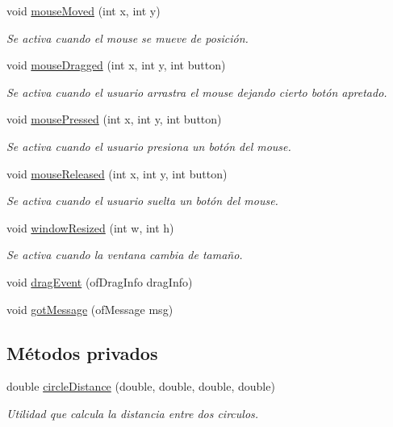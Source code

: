 \begin{DoxyCompactItemize}
void \hyperlink{classof_app_a158b41a606310db4633fdb817b21047c}{mouse\+Moved} (int x, int y)
\begin{DoxyCompactList}\small\item\em Se activa cuando el mouse se mueve de posición. \end{DoxyCompactList}\item 
void \hyperlink{classof_app_a1ec53d1be799dc275806ff6c6548cd83}{mouse\+Dragged} (int x, int y, int button)
\begin{DoxyCompactList}\small\item\em Se activa cuando el usuario arrastra el mouse dejando cierto botón apretado. \end{DoxyCompactList}\item 
void \hyperlink{classof_app_a2c2ea9c160231e55424dfd98466ef27d}{mouse\+Pressed} (int x, int y, int button)
\begin{DoxyCompactList}\small\item\em Se activa cuando el usuario presiona un botón del mouse. \end{DoxyCompactList}\item 
void \hyperlink{classof_app_aa3131f1554fc49eaa9ee0f284e48129b}{mouse\+Released} (int x, int y, int button)
\begin{DoxyCompactList}\small\item\em Se activa cuando el usuario suelta un botón del mouse. \end{DoxyCompactList}\item 
void \hyperlink{classof_app_ae4dc1ec1513dcbe48bc78a5e4c3fac0f}{window\+Resized} (int w, int h)
\begin{DoxyCompactList}\small\item\em Se activa cuando la ventana cambia de tamaño. \end{DoxyCompactList}\item 
void \hyperlink{classof_app_aada5a79556321801567752a0e5a69bda}{drag\+Event} (of\+Drag\+Info drag\+Info)
\item 
void \hyperlink{classof_app_a885672a72340a5e998af1d16718dc766}{got\+Message} (of\+Message msg)
\end{DoxyCompactItemize}
\subsection*{Métodos privados}
\begin{DoxyCompactItemize}
\item 
double \hyperlink{classof_app_a1955e470a29da6a317400eeece4e4428}{circle\+Distance} (double, double, double, double)
\begin{DoxyCompactList}\small\item\em Utilidad que calcula la distancia entre dos circulos. \end{DoxyCompactList}\end{DoxyCompactItemize}
